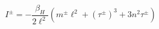 \begin{equation}
I^{\pm }=-\frac{\beta _{H}}{2\ell ^{2}}(m^{\pm }\ell ^{2}+\left( \tau ^{\pm
}\right) ^{3}+3n^{2}\tau ^{\pm })  \label{acttot}
\end{equation}%
